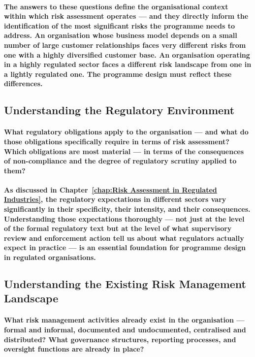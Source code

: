 \paragraph{The answers to these questions define the organisational context within which risk assessment operates — and they directly inform the identification of the most significant risks the programme needs to address. An organisation whose business model depends on a small number of large customer relationships faces very different risks from one with a highly diversified customer base. An organisation operating in a highly regulated sector faces a different risk landscape from one in a lightly regulated one. The programme design must reflect these differences.}

\subsection{Understanding the Regulatory Environment}
\paragraph{What regulatory obligations apply to the organisation — and what do those obligations specifically require in terms of risk assessment? Which obligations are most material — in terms of the consequences of non-compliance and the degree of regulatory scrutiny applied to them?}
\paragraph{As discussed in Chapter~\ref{chap:Risk Assessment in Regulated Industries}, the regulatory expectations in different sectors vary significantly in their specificity, their intensity, and their consequences. Understanding those expectations thoroughly — not just at the level of the formal regulatory text but at the level of what supervisory review and enforcement action tell us about what regulators actually expect in practice — is an essential foundation for programme design in regulated organisations.}

\subsection{Understanding the Existing Risk Management Landscape}
\paragraph{What risk management activities already exist in the organisation — formal and informal, documented and undocumented, centralised and distributed? What governance structures, reporting processes, and oversight functions are already in place?}
